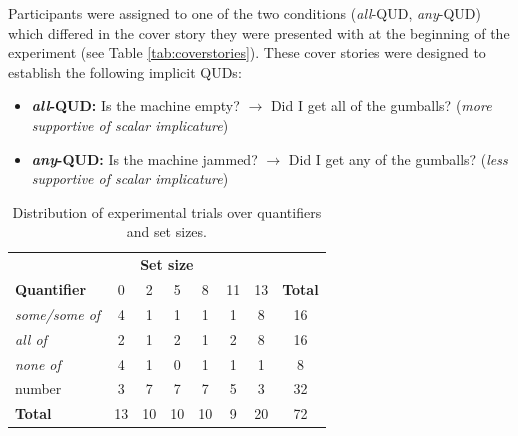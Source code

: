 \documentclass[10pt,letterpaper]{article}
\begin{document}
Participants were assigned to one of the two conditions (\textit{all}-QUD, \textit{any}-QUD) which differed in the cover story they were presented with at the beginning of the experiment (see Table \ref{tab:coverstories}). These cover stories were designed to establish the following implicit QUDs:
\begin{itemize}
\item \textbf{\textit{all}-QUD:} Is the machine empty? $\rightarrow$ Did I get all of the gumballs? (\textit{more supportive of scalar implicature})
\item \textbf{\textit{any}-QUD:} Is the machine jammed? $\rightarrow$ Did I get any of the gumballs? (\textit{less supportive of scalar implicature})
\end{itemize}



  \begin{table}
      \begin{tabular}{lccccccc}
      \midrule
      \multicolumn{8}{c}{\textbf{Set size}} \\
      \textbf{Quantifier} & 0 & 2 & 5 & 8 & 11 & 13 & \multicolumn{1}{l}{\textbf{Total}} \\
      \midrule
      \textit{some/some of} & 4 & 1 & 1 & 1 & 1 & 8 & 16 \\
      \textit{all of} & 2 & 1 & 2 & 1 & 2 & 8 & 16 \\
      \textit{none of} & 4 & 1 & 0 & 1 & 1 & 1 & 8 \\
      number & 3 & 7 & 7 & 7 & 5 & 3 & 32 \\
      \bottomrule
      \textbf{Total} & 13 & 10 & 10 & 10 & 9 & 20 & 72
      \end{tabular}
    \caption{Distribution of experimental trials over quantifiers and set sizes.\label{tab:stimuli}}
  \end{table}
  
\end{document}

